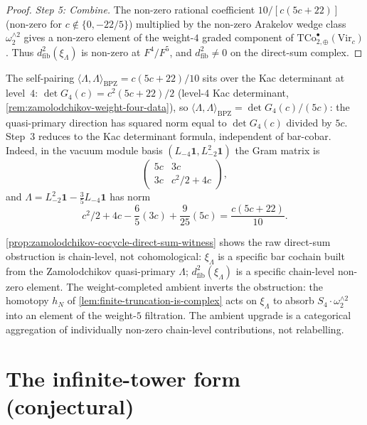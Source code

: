 \begin{proof}
\emph{Step 5: Combine.} The non-zero rational coefficient
\(10 / [c(5c+22)]\) (non-zero for \(c \notin \{0, -22/5\}\))
multiplied by the non-zero Arakelov wedge class
\(\omega_{2}^{\wedge 2}\) gives a non-zero element of the
weight-\(4\) graded component of
\(\mathrm{TCo}^{\bullet}_{2,\oplus}(\mathrm{Vir}_{c})\). Thus
\(d^{2}_{\mathrm{fib}}(\xi_{\Lambda})\) is non-zero at
\(F^{4}/F^{5}\), and \(d^{2}_{\mathrm{fib}} \ne 0\) on the
direct-sum complex.
\end{proof}

\begin{remark}
\label{rem:self-pairing-and-det-G4}
The self-pairing
\(\langle \Lambda, \Lambda \rangle_{\mathrm{BPZ}} = c(5c+22)/10\)
sits over the Kac determinant at level~\(4\):
\(\det G_{4}(c) = c^{2}(5c + 22)/2\) (level-4 Kac determinant,
\autoref{rem:zamolodchikov-weight-four-data}), so
\(\langle \Lambda, \Lambda\rangle_{\mathrm{BPZ}} = \det G_{4}(c)/(5c)\):
the quasi-primary direction has squared norm equal to
\(\det G_{4}(c)\) divided by \(5c\). Step~3 reduces to
the Kac determinant formula, independent of bar-cobar.
Indeed, in the vacuum module basis
\((L_{-4}\mathbf1,L_{-2}^{2}\mathbf1)\) the Gram matrix is
\[
\begin{pmatrix}
5c & 3c\\
3c & c^{2}/2+4c
\end{pmatrix},
\]
and
\(\Lambda=L_{-2}^{2}\mathbf1-\frac35 L_{-4}\mathbf1\) has norm
\[
c^{2}/2+4c-\frac65(3c)+\frac9{25}(5c)
=\frac{c(5c+22)}{10}.
\]
\end{remark}

\begin{remark}
\label{rem:why-not-cosmetic}
\autoref{prop:zamolodchikov-cocycle-direct-sum-witness} shows
the raw direct-sum obstruction is chain-level, not
cohomological: \(\xi_{\Lambda}\) is a specific bar cochain
built from the Zamolodchikov quasi-primary \(\Lambda\);
\(d^{2}_{\mathrm{fib}}(\xi_{\Lambda})\) is a specific chain-level
non-zero element. The weight-completed ambient inverts the
obstruction: the homotopy \(h_{N}\) of
\autoref{lem:finite-truncation-is-complex} acts on
\(\xi_{\Lambda}\) to absorb \(S_{4} \cdot \omega_{2}^{\wedge 2}\)
into an element of the weight-\(5\) filtration. The ambient
upgrade is a categorical aggregation of individually non-zero
chain-level contributions, not relabelling.
\end{remark}

\section{The infinite-tower form (conjectural)}
\label{sec:infinite-tower}


